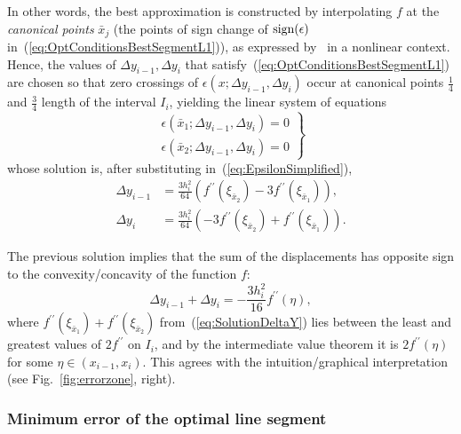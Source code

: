\documentclass[a4paper,english]{IEEEtran}
\begin{document}
In other words, the best approximation is constructed by interpolating
$f$ at the \emph{canonical points} $\bar{x}_{j}$ (the points of
sign change of ${\text{sign}}(\text{\ensuremath{\epsilon}})$ in~(\ref{eq:OptConditionsBestSegmentL1})),
as expressed by~\cite{Rice1964b}\cite{Rice1964BookVol1} in a nonlinear
context. Hence, the values of $\Delta y_{i-1},\Delta y_{i}$ that
satisfy~(\ref{eq:OptConditionsBestSegmentL1}) are chosen so that
zero crossings of $\epsilon(x;\Delta y_{i-1},\Delta y_{i})$ occur
at canonical points $\frac{1}{4}$ and $\frac{3}{4}$ length of the
interval $I_{i}$, yielding the linear system of equations
\[
\left.\begin{array}{c}
\epsilon(\bar{x}_{1};\Delta y_{i-1},\Delta y_{i})=0\\
\epsilon(\bar{x}_{2};\Delta y_{i-1},\Delta y_{i})=0
\end{array}\right\} 
\]
 whose solution is, after substituting in~(\ref{eq:EpsilonSimplified}),
\begin{equation}
\begin{aligned}\Delta y_{i-1} & =\frac{3h_{i}^{2}}{64}\left({{f}^{\prime\prime}}(\xi_{\bar{x}_{2}})-3{{f}^{\prime\prime}}(\xi_{\bar{x}_{1}})\right),\\
\Delta y_{i} & =\frac{3h_{i}^{2}}{64}\left(-3{{f}^{\prime\prime}}(\xi_{\bar{x}_{2}})+{{f}^{\prime\prime}}(\xi_{\bar{x}_{1}})\right).
\end{aligned}
\label{eq:SolutionDeltaY}
\end{equation}

The previous solution implies that the sum of the displacements has
opposite sign to the convexity/concavity of the function ${f}$:
\begin{equation}
\Delta y_{i-1}+\Delta y_{i}=-\frac{3h_{i}^{2}}{16}{{f}^{\prime\prime}}(\eta),\label{eq:SumDeltays}
\end{equation}
where ${{f}^{\prime\prime}}(\xi_{\bar{x}_{1}})+{{f}^{\prime\prime}}(\xi_{\bar{x}_{2}})$ from~(\ref{eq:SolutionDeltaY})
lies between the least and greatest values of $2{{f}^{\prime\prime}}$ on $I_{i}$,
and by the intermediate value theorem it is $2{{f}^{\prime\prime}}(\eta)$ for some
$\eta\in(x_{i-1},x_{i})$. This agrees with the intuition/graphical
interpretation (see Fig.~\ref{fig:errorzone}, right).

\subsubsection{Minimum error of the optimal line segment}
\end{document}
